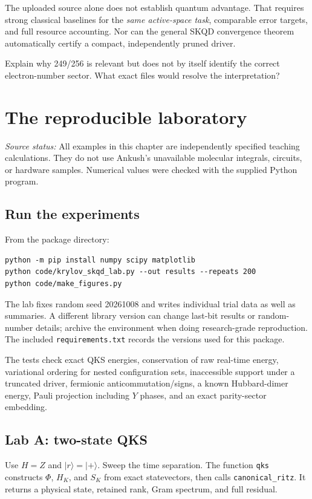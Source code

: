 \documentclass[11pt,a4paper,oneside]{report}
\newcommand{\ket}[1]{\lvert #1\rangle}
\newcommand{\src}[1]{\par{\small\color{grey}\textit{Source status:} #1}\par}
\newcommand{\checkpoint}[1]{\begin{idea}[Check your understanding]#1\end{idea}}
\begin{document}
The uploaded source alone does not establish quantum advantage. That requires strong classical baselines for the \emph{same active-space task}, comparable error targets, and full resource accounting. Nor can the general SKQD convergence theorem automatically certify a compact, independently pruned driver.

\checkpoint{Explain why 249/256 is relevant but does not by itself identify the correct electron-number sector. What exact files would resolve the interpretation?}

\chapter{The reproducible laboratory}\label{ch:lab}
\src{All examples in this chapter are independently specified teaching calculations. They do not use Ankush's unavailable molecular integrals, circuits, or hardware samples. Numerical values were checked with the supplied Python program.}

\section{Run the experiments}
From the package directory:
\begin{lstlisting}
python -m pip install numpy scipy matplotlib
python code/krylov_skqd_lab.py --out results --repeats 200
python code/make_figures.py
\end{lstlisting}
The lab fixes random seed 20261008 and writes individual trial data as well as summaries. A different library version can change last-bit results or random-number details; archive the environment when doing research-grade reproduction. The included \texttt{requirements.txt} records the versions used for this package.

The tests check exact QKS energies, conservation of raw real-time energy, variational ordering for nested configuration sets, inaccessible support under a truncated driver, fermionic anticommutation/signs, a known Hubbard-dimer energy, Pauli projection including $Y$ phases, and an exact parity-sector embedding.

\section{Lab A: two-state QKS}
Use $H=Z$ and $\ket r=\ket+$. Sweep the time separation. The function \texttt{qks} constructs $\Phi$, $H_K$, and $S_K$ from exact statevectors, then calls \texttt{canonical\_ritz}. It returns a physical state, retained rank, Gram spectrum, and full residual.
\end{document}
